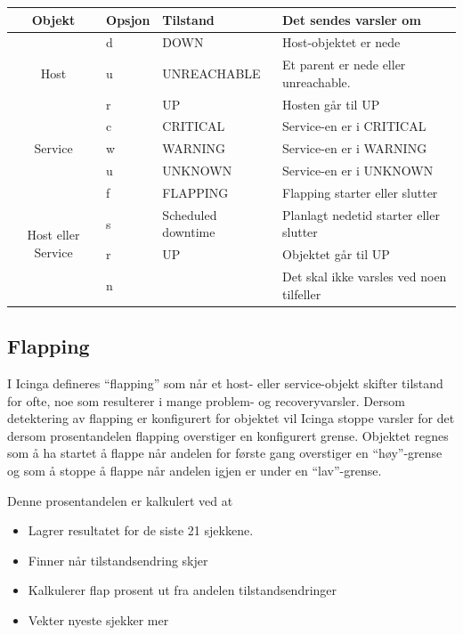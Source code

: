 \begin{table}
\begin{center}
\begin{tabular}{| c | l | l | p{7cm} |}
        \hline
        \textbf{Objekt} & \textbf{Opsjon} & \textbf{Tilstand} & \textbf{Det sendes varsler om}
        \\ \hline
	\multirow{3}{*}{Host} & d & DOWN 			& Host-objektet er nede 			\\ \cline{2-4}
					    & u & UNREACHABLE 		& Et parent er nede eller unreachable.		\\ \cline{2-4}	
					    & r & UP 			& Hosten går til UP				\\ \hline 
        \multirow{3}{*}{Service} 	    & c & CRITICAL 		& Service-en er i CRITICAL 			\\ \cline{2-4}
					    & w & WARNING  		& Service-en er i WARNING  			\\ \cline{2-4}
					    & u & UNKNOWN  		& Service-en er i UNKNOWN  			\\ \hline
	\multirow{4}{*}{Host eller Service} & f & FLAPPING           	& Flapping starter eller slutter 		\\ \cline{2-4}
					    & s & Scheduled downtime 	& Planlagt nedetid starter eller slutter 	\\ \cline{2-4}
				 	    & r & UP                 	& Objektet går til UP 				\\ \cline{2-4}  
					    & n &                    	& Det skal ikke varsles ved noen tilfeller 	\\ \cline{2-4}

	\hline
\end{tabular}
\label{objekt_varsling}
\end{center}
\end{table}


\subsection{Flapping}
I Icinga defineres “flapping” som når et host- eller service-objekt skifter tilstand for ofte, noe som resulterer i mange problem- og recoveryvarsler. \cite{icingaflapping} Dersom detektering av flapping er konfigurert for objektet vil Icinga stoppe varsler for det dersom prosentandelen flapping overstiger en konfigurert grense. Objektet regnes som å ha startet å flappe når andelen for første gang overstiger en “høy”-grense og som å stoppe å flappe når andelen igjen er under en “lav”-grense.

Denne prosentandelen er kalkulert ved at
\begin{itemize}
	\item Lagrer resultatet for de siste 21 sjekkene.
	\item Finner når tilstandsendring skjer 
	\item Kalkulerer flap prosent ut fra andelen tilstandsendringer
	\item Vekter nyeste sjekker mer
\end{itemize}

